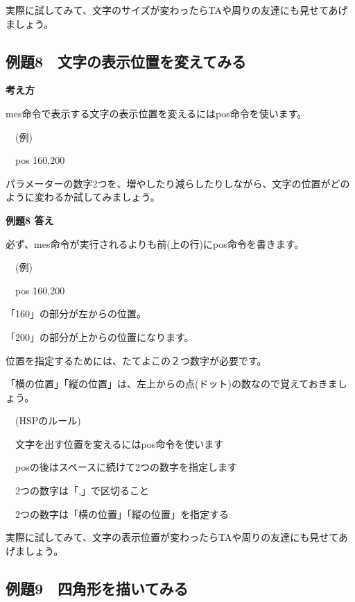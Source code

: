 \documentclass[a4paper,12pt]{jarticle}
\begin{document}
実際に試してみて、文字のサイズが変わったらTAや周りの友達にも見せてあげましょう。


\clearpage
\subsection{例題8　文字の表示位置を変えてみる}
\bigskip
\bigskip

{\bfseries
考え方}

\bigskip

mes命令で表示する文字の表示位置を変えるにはpos命令を使います。


\bigskip

\ \ (例)

\ \ pos 160,200


\bigskip

パラメーターの数字2つを、増やしたり減らしたりしながら、文字の位置がどのように変わるか試してみましょう。

\bigskip

\bigskip

{\bfseries
例題8 答え}

\bigskip

必ず、mes命令が実行されるよりも前(上の行)にpos命令を書きます。


\bigskip

\ \ (例)

\ \ pos 160,200


\bigskip

「160」の部分が左からの位置。

「200」の部分が上からの位置になります。

位置を指定するためには、たてよこの２つ数字が必要です。

「横の位置」「縦の位置」は、左上からの点(ドット)の数なので覚えておきましょう。


\bigskip

\ \ (HSPのルール)


\bigskip

\ \ 文字を出す位置を変えるにはpos命令を使います

\ \ posの後はスペースに続けて2つの数字を指定します

\ \ 2つの数字は「,」で区切ること

\ \ 2つの数字は「横の位置」「縦の位置」を指定する


\bigskip

実際に試してみて、文字の表示位置が変わったらTAや周りの友達にも見せてあげましょう。



\clearpage
\subsection{例題9　四角形を描いてみる}
\bigskip
\bigskip
\end{document}
